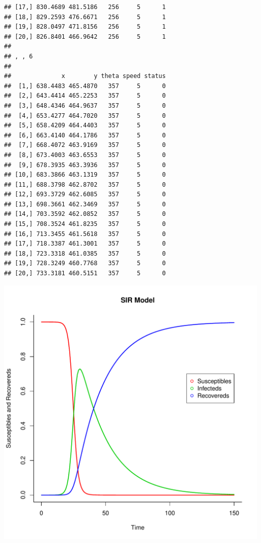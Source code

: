 \documentclass{article}\usepackage[]{graphicx}\usepackage[]{color}
\makeatletter
\def\maxwidth{ %
  \ifdim\Gin@nat@width>\linewidth
    \linewidth
  \else
    \Gin@nat@width
  \fi
}
\newenvironment{kframe}{%
 \def\at@end@of@kframe{}%
 \ifinner\ifhmode%
  \def\at@end@of@kframe{\end{minipage}}%
  \begin{minipage}{\columnwidth}%
 \fi\fi%
 \def\FrameCommand##1{\hskip\@totalleftmargin \hskip-\fboxsep
 \colorbox{shadecolor}{##1}\hskip-\fboxsep
     \hskip-\linewidth \hskip-\@totalleftmargin \hskip\columnwidth}%
 \MakeFramed {\advance\hsize-\width
   \@totalleftmargin\z@ \linewidth\hsize
   \@setminipage}}%
 {\par\unskip\endMakeFramed%
 \at@end@of@kframe}
\newenvironment{knitrout}{}{} %
\makeatother
\begin{document}
\begin{knitrout}
\begin{kframe}
\begin{verbatim}
## [17,] 830.4689 481.5186   256     5      1
## [18,] 829.2593 476.6671   256     5      1
## [19,] 828.0497 471.8156   256     5      1
## [20,] 826.8401 466.9642   256     5      1
## 
## , , 6
## 
##              x        y theta speed status
##  [1,] 638.4483 465.4870   357     5      0
##  [2,] 643.4414 465.2253   357     5      0
##  [3,] 648.4346 464.9637   357     5      0
##  [4,] 653.4277 464.7020   357     5      0
##  [5,] 658.4209 464.4403   357     5      0
##  [6,] 663.4140 464.1786   357     5      0
##  [7,] 668.4072 463.9169   357     5      0
##  [8,] 673.4003 463.6553   357     5      0
##  [9,] 678.3935 463.3936   357     5      0
## [10,] 683.3866 463.1319   357     5      0
## [11,] 688.3798 462.8702   357     5      0
## [12,] 693.3729 462.6085   357     5      0
## [13,] 698.3661 462.3469   357     5      0
## [14,] 703.3592 462.0852   357     5      0
## [15,] 708.3524 461.8235   357     5      0
## [16,] 713.3455 461.5618   357     5      0
## [17,] 718.3387 461.3001   357     5      0
## [18,] 723.3318 461.0385   357     5      0
## [19,] 728.3249 460.7768   357     5      0
## [20,] 733.3181 460.5151   357     5      0
\end{verbatim}
\end{kframe}
\includegraphics[width=\maxwidth]{figure/unnamed-chunk-2-1} 

\end{knitrout}
\end{document}
